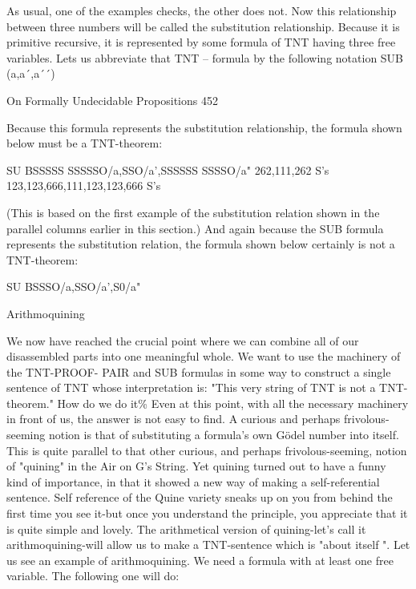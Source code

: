 As usual, one of the examples checks, the other does not. Now this relationship between
three numbers will be called the substitution relationship. Because it is primitive
recursive, it is represented by some formula of TNT having three free variables. Lets us
abbreviate that TNT – formula by the following notation
                                      SUB (a,a´,a´´)



On Formally Undecidable Propositions                                                   452

      Because this formula represents the substitution relationship, the formula shown
below must be a TNT-theorem:

                SU B{SSSSS SSSSSO/a,SSO/a',SSSSSS SSSSO/a"}
                262,111,262 S's 123,123,666,111,123,123,666 S's

(This is based on the first example of the substitution relation shown in the parallel
columns earlier in this section.) And again because the SUB formula represents the
substitution relation, the formula shown below certainly is not a TNT-theorem:

                              SU B{SSSO/a,SSO/a',S0/a"}

                                     Arithmoquining

We now have reached the crucial point where we can combine all of our disassembled
parts into one meaningful whole. We want to use the machinery of the TNT-PROOF-
PAIR and SUB formulas in some way to construct a single sentence of TNT whose
interpretation is: "This very string of TNT is not a TNT-theorem." How do we do it\%
Even at this point, with all the necessary machinery in front of us, the answer is not easy
to find.
         A curious and perhaps frivolous-seeming notion is that of substituting a formula's
own Gödel number into itself. This is quite parallel to that other curious, and perhaps
frivolous-seeming, notion of "quining" in the Air on G's String. Yet quining turned out to
have a funny kind of importance, in that it showed a new way of making a self-referential
sentence. Self reference of the Quine variety sneaks up on you from behind the first time
you see it-but once you understand the principle, you appreciate that it is quite simple and
lovely. The arithmetical version of quining-let's call it arithmoquining-will allow us to
make a TNT-sentence which is "about itself ".
         Let us see an example of arithmoquining. We need a formula with at least one
free variable. The following one will do:

